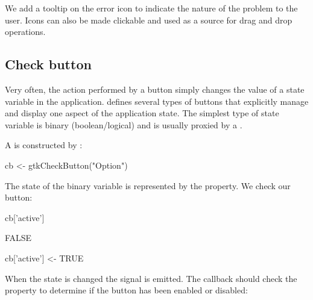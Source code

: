 \begin{Schunk}
\end{Schunk}
%
We add a tooltip on the error icon to indicate the nature of the
problem to the user. Icons can also be made clickable and used as a
source for drag and drop operations.

\subsection{Check button}
\label{sec:RGtk2:gtkCheckbox}

Very often, the action performed by a button simply changes the value
of a state variable in the application. \GTK\/ defines several types
of buttons that explicitly manage and display one aspect of the
application state. The simplest type of state variable is binary
(boolean/logical) and is usually proxied by a .

A  is constructed by
:
\begin{Schunk}
\begin{Sinput}
 cb <- gtkCheckButton("Option")
\end{Sinput}
\end{Schunk}
%
The state of the binary variable is represented by the
 property. We check our button:
\begin{Schunk}
\begin{Sinput}
 cb['active']
\end{Sinput}
\begin{Soutput}
[1] FALSE
\end{Soutput}
\begin{Sinput}
 cb['active'] <- TRUE
\end{Sinput}
\end{Schunk}

When the state is changed the  signal is emitted. The
callback should check the  property to determine if the
button has been enabled or disabled:
\begin{Schunk}
\end{Schunk}

